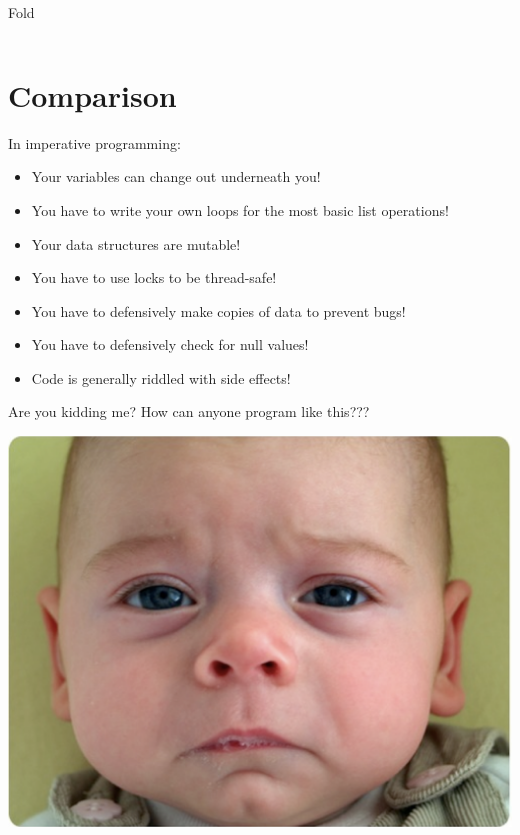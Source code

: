 \documentclass[mathserif]{beamer}
\begin{document}
\begin{frame}{Fold}

  \inputminted[fontsize=\small,firstline=57,lastline=71]{haskell}{code/haskell/accounts.hs}

\end{frame}

\section{Comparison}

\begin{frame}

  In imperative programming:

  \begin{itemize}[<+->]
  \item Your variables can change out underneath you!
  \item You have to write your own loops for the most basic list operations!
  \item Your data structures are mutable!
  \item You have to use locks to be thread-safe!
  \item You have to defensively make copies of data to prevent bugs!
  \item You have to defensively check for null values!
  \item Code is generally riddled with side effects!
  \end{itemize}
\end{frame}

\begin{frame}{Are you kidding me?}
  How can anyone program like this???
  \begin{center}
    \includegraphics[scale=0.3]{img/sadbaby.png}
  \end{center}
\end{frame}
\end{document}
